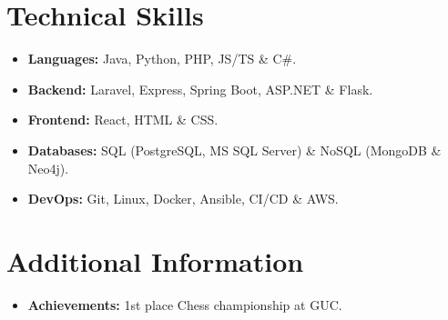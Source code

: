 \documentclass[a4paper,11pt]{article}
\begin{document}
\begin{enumerate}

\end{enumerate}



\section{\textbf{Technical Skills}}

\begin{itemize}[noitemsep, topsep=0pt, partopsep=0pt, parsep=0pt, itemindent=0pt, leftmargin=*]
    \item \textbf{Languages:} Java, Python, PHP, JS/TS \& C\#.
    \item \textbf{Backend:} Laravel, Express, Spring Boot, ASP.NET \& Flask.
    \item \textbf{Frontend:} React, HTML \& CSS.
    \item \textbf{Databases:} SQL (PostgreSQL, MS SQL Server) \& NoSQL (MongoDB \& Neo4j).
    \item \textbf{DevOps:} Git, Linux, Docker, Ansible, CI/CD \& AWS.
\end{itemize}


\section{\textbf{Additional Information}}
\begin{itemize}
    \item \textbf{Achievements:} 1st place Chess championship at GUC.
\end{itemize}
 
\end{document}
